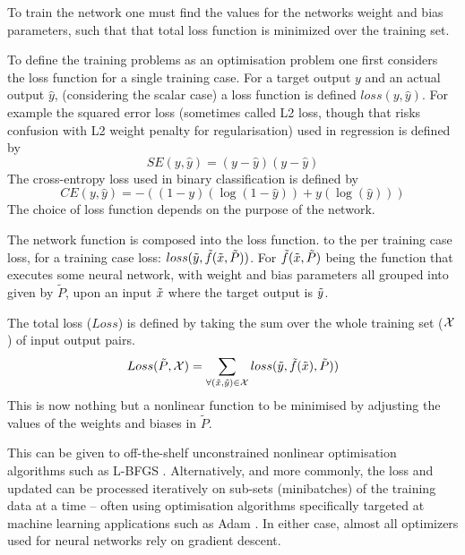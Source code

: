 \documentclass[12pt,parskip]{komatufte}
\begin{document}
To train the network one must find the values for the networks weight and bias parameters, such that that total loss function is minimized over the training set.

To define the training problems as an optimisation problem one first considers the loss function for a single training case.
For a target output $y$ and an actual output $\hat{y}$, (considering the scalar case) a loss function is defined $loss(y, \hat{y})$.
For example the squared error loss (sometimes called L2 loss, though that risks confusion with L2 weight penalty for regularisation) used in regression is defined by
\begin{equation}
SE(y, \hat{y})=(y-\hat{y})(y-\hat{y})
\end{equation}
The cross-entropy loss used in binary classification is defined by
\begin{equation}
	CE(y, \hat{y})=-\left((1-y)(\log (1-\hat{y})) + y(\log (\hat{y}))\right)
\end{equation}
The choice of loss function depends on the purpose of the network.

The network function is composed into the loss function.
to the per training case loss, for a training case loss: $loss(\tilde{y}, \tilde{f}(\tilde{x},\tilde{P}))$.
For $\tilde{f}(\tilde{x},\tilde{P})$ being the function that executes some neural network, with weight and bias parameters all grouped into given by $\tilde{P}$, upon an input $\tilde{x}$ where the target output is $\tilde{y}$.

The total loss ($Loss$) is defined by taking the sum over the whole training set ($\mathcal{X}$) of input output pairs.
\begin{equation}
Loss(\tilde{P}, \mathcal{X}) = \sum_{\forall (\tilde{x}, \tilde{y})\in\mathcal{X}} loss(\tilde{y}, \tilde{f}(\tilde{x}),\tilde{P}))
\end{equation}
This is now nothing but a nonlinear function to be minimised by adjusting the values of the weights and biases in $\tilde{P}$.

This can be given to off-the-shelf  unconstrained nonlinear optimisation algorithms  such as L-BFGS  \parencite{nocedal1980updating}.
Alternatively, and more commonly, the loss and updated can be processed iteratively on sub-sets (minibatches) of the training data at a time -- often using optimisation algorithms specifically targeted at machine learning applications such as Adam \parencite{kingma2014adam}.
In either case, almost all optimizers used for neural networks rely on gradient descent.
\end{document}
